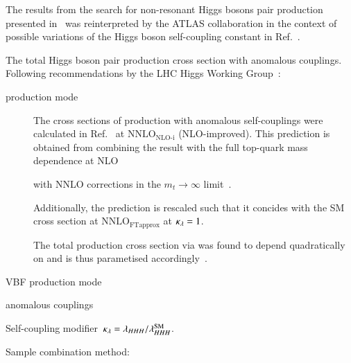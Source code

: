 The results from the search for non-resonant Higgs bosons pair
production presented in~ was reinterpreted by the
ATLAS collaboration in the context of possible variations of the Higgs
boson self-coupling constant \lambdahhh in
Ref.~\cite{ATLAS-CONF-2021-052}.


The total Higgs boson pair production cross section with anomalous
couplings. Following recommendations by the LHC Higgs Working
Group~\cite{LHCHWGHH}:
\begin{description}

\item[\ggF production mode] The cross sections of \HH production with
  anomalous self-couplings were calculated in
  Ref.~\cite{Amoroso:2020lgh} at $\text{NNLO}_{\text{NLO-i}}$
  (NLO-improved). This prediction is obtained from combining the
  result with the full top-quark mass dependence at
  NLO~\cite{Buchalla:2018yce}


  with NNLO corrections in the $m_{t} \to \infty$
  limit~\cite{deFlorian:2017qfk}.

  Additionally, the prediction is rescaled such that it concides with
  the SM \HH cross section at $\text{NNLO}_{\text{FTapprox}}$ at
  $\kappa_{\lambda} = 1$.

  The total \HH production cross section via \ggF was found to depend
  quadratically on \klambda and is thus parametised
  accordingly~\cite{LHCHWGHH}.


\item[VBF production mode]


\end{description}





anomalous couplings

Self-coupling modifier~$\kappa_{\lambda} = \lambda_{HHH} / \lambda_{HHH}^{\text{SM}}$.


Sample combination method:~\cite{ATL-PHYS-PUB-2019-007}

